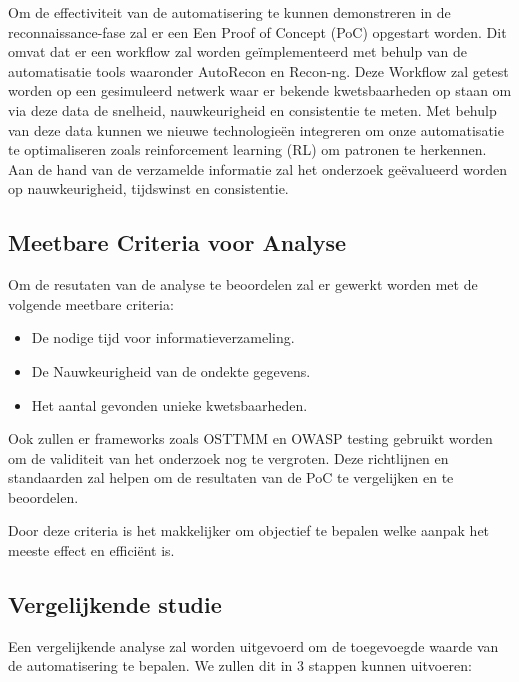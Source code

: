 Om de effectiviteit van de automatisering te kunnen demonstreren in de reconnaissance-fase zal er een Een Proof of Concept (PoC) opgestart worden.
Dit omvat dat er een workflow zal worden geïmplementeerd met behulp van de automatisatie tools waaronder AutoRecon en Recon-ng. Deze
Workflow zal getest worden op een gesimuleerd netwerk waar er bekende kwetsbaarheden op staan om via deze data de snelheid,
nauwkeurigheid en consistentie te meten. Met behulp van deze data kunnen we nieuwe technologieën integreren om onze automatisatie te optimaliseren
zoals reinforcement learning (RL) om patronen te herkennen.
Aan de hand van de verzamelde informatie zal het onderzoek geëvalueerd worden op nauwkeurigheid, tijdswinst en consistentie.


\newpage
\subsection{Meetbare Criteria voor Analyse}

Om de resutaten van de analyse te beoordelen zal er gewerkt worden met de volgende meetbare criteria:
\begin{itemize}
    \item De nodige tijd voor informatieverzameling.
    \item De Nauwkeurigheid van de ondekte gegevens.
    \item Het aantal gevonden unieke kwetsbaarheden.
\end{itemize}

Ook zullen er frameworks zoals OSTTMM en OWASP testing gebruikt worden om de validiteit van het onderzoek nog te vergroten.
Deze richtlijnen en standaarden zal helpen om de resultaten van de PoC te vergelijken en te beoordelen.

Door deze criteria is het makkelijker om objectief te bepalen welke aanpak het meeste effect en efficiënt is.



\subsection{Vergelijkende studie}

Een vergelijkende analyse zal worden uitgevoerd om de toegevoegde waarde van de automatisering te bepalen. We zullen dit in 3 stappen kunnen uitvoeren:

